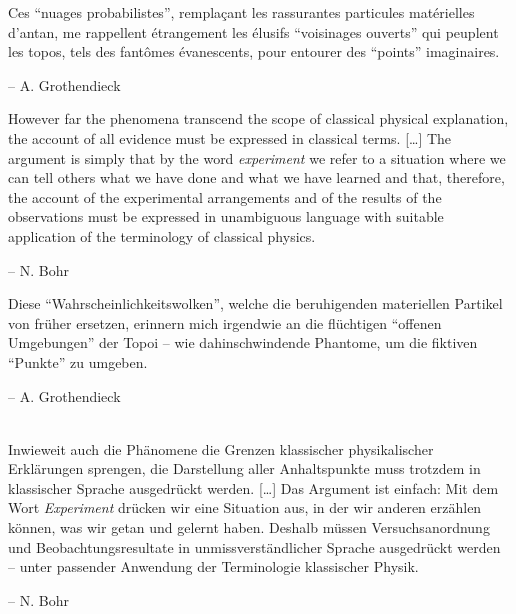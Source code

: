 \documentclass[12pt,a4paper,ngerman,landscape]{scrartcl}
\begin{document}
\Large

\begin{multicols*}{2}

Ces “nuages probabilistes”, remplaçant les rassurantes particules matérielles
d’antan, me rappellent étrangement les élusifs “voisinages ouverts” qui
peuplent les topos, tels des fantômes évanescents, pour entourer des “points”
imaginaires.

\hfill -- A. Grothendieck

\vfill


However far the phenomena transcend the scope of classical physical
explanation, the account of all evidence must be expressed in
classical terms. [\ldots] The argument is simply that by the word {\it
experiment} we refer to a situation where we can tell others what we
have done and what we have learned and that, therefore, the account of
the experimental arrangements and of the results of the observations
must be expressed in unambiguous language with suitable application of
the terminology of classical physics.

\hfill -- N. Bohr

\vfill

\columnbreak


Diese "`Wahrscheinlichkeitswolken"', welche die beruhigenden materiellen
Partikel von früher ersetzen, erinnern mich irgendwie an die flüchtigen
"`offenen Umgebungen"' der Topoi -- wie dahinschwindende Phantome, um
die fiktiven "`Punkte"' zu umgeben.

\hfill -- A. Grothendieck

\vfill

\ \\
Inwieweit auch die Phänomene die Grenzen klassischer physikalischer
Erklärungen sprengen, die Darstellung aller Anhaltspunkte muss trotzdem
in klassischer Sprache ausgedrückt werden. [\ldots] Das Argument ist einfach:
Mit dem Wort {\it Experiment} drücken wir eine Situation aus, in der wir
anderen erzählen können, was wir getan und gelernt haben. Deshalb müssen
Versuchsanordnung und Beobachtungsresultate in
unmissverständlicher Sprache ausgedrückt werden -- unter passender
Anwendung der Terminologie klassischer Physik.

\hfill -- N. Bohr
\end{multicols*}
\end{document}
